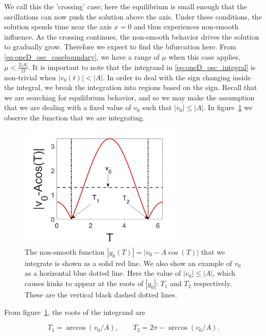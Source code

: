 We call this the 'crossing' case; here the equilibrium is small enough that the oscillations can now push the solution above the axis. Under these conditions, the solution spends time near the axis $x=0$ and thus experiences non-smooth influence. As the crossing continues, the non-smooth behavior drives the solution to gradually grow. Therefore we expect to find the bifurcation here. From \eqref{eq:oneD_osc_caseboundary}, we have a range of $\mu$ when this case applies, $\mu<\frac{2|A|}{\Omega}$. It is important to note that the integrand in \eqref{eq:oneD_osc_integral} is non-trivial when $|v_0(t)|<|A|$. In order to deal with the sign changing inside the integral, we break the integration into regions based on the sign. Recall that we are searching for equilibrium behavior, and so we may make the assumption that we are dealing with a fixed value of $v_0$ such that $|v_0|\le |A|$. In figure~\ref{fig:oneD_osc_t1t2_graphic} we observe the function that we are integrating.

\begin{figure}[H]
\centering
\includegraphics[width=0.7\textwidth]{oneD/t1t2_graphic.jpg}
\caption{The non-smooth function $|y_0(T)|=|v_0-A\cos(T)|$ that we integrate is shown as a solid red line. We also show an example of $v_0$ as a horizontal blue dotted line. Here the value of $|v_0|\le|A|$, which causes kinks to appear at the roots of $|y_0|$: $T_1$ and $T_2$ respectively. These are the vertical black dashed dotted lines. }
\label{fig:oneD_osc_t1t2_graphic}
\end{figure}

\indent From figure~\ref{fig:oneD_osc_t1t2_graphic}, the roots of the integrand are 

\begin{equation*}
T_1=\arccos (v_0/A),\qquad T_2= 2\pi - \arccos (v_0/A).
\end{equation*}

